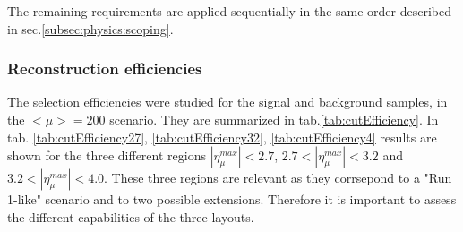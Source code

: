 \documentclass[a4paper,twoside,12pt]{article}
\begin{document}
The remaining requirements are applied sequentially in the same order described in sec.\ref{subsec:physics:scoping}.

\subsubsection{Reconstruction efficiencies}\label{subsec:recoEfficiency}

The selection efficiencies were studied for the signal and background samples, in the $<\mu> = 200$ scenario. They are summarized in 
tab.\ref{tab:cutEfficiency}. In tab. \ref{tab:cutEfficiency27}, \ref{tab:cutEfficiency32}, \ref{tab:cutEfficiency4} results are shown for the three different regions $|\eta_{\mu}^{max}| < 2.7$, 
$2.7 < |\eta_{\mu}^{max}| < 3.2$ and $3.2 < |\eta_{\mu}^{max}| < 4.0$. These three regions are relevant as they corrsepond to a "Run 1-like" scenario and to two possible extensions. Therefore
it is important to assess the different capabilities of the three layouts.\\
\end{document}
